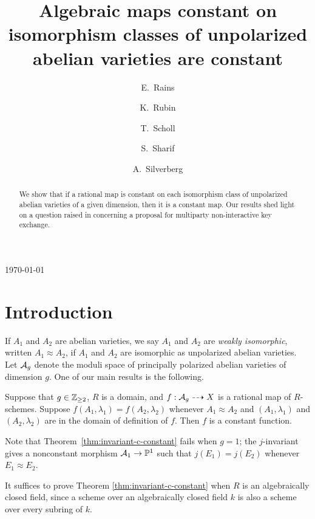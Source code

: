 \documentclass{amsart}
\title[Algebraic maps constant on unpolarized isomorphism classes]{Algebraic maps constant on isomorphism classes of unpolarized abelian varieties are constant}
\author[E.\ Rains]{E.\ Rains}
\author[K.\ Rubin]{K.\ Rubin}
\author[T.\ Scholl]{T.\ Scholl}
\author[S.\ Sharif]{S.\ Sharif}
\author[A.\ Silverberg]{A.\ Silverberg}
\begin{document}
\begin{abstract}
We show that if a %
rational map is constant on each isomorphism class of unpolarized abelian varieties of a given dimension, then it is a constant map. 
Our results shed light on a question raised in \cite{multiparty} concerning a proposal for multiparty non-interactive key exchange.
\end{abstract}


\today
\maketitle



\section{Introduction}
\label{sec:introduction}

If $A_1$ and $A_2$ are abelian varieties, we say $A_1$ and $A_2$ are \emph{weakly isomorphic}, written $A_1 \approx A_2$, if $A_1$ and $A_2$ are isomorphic as unpolarized abelian varieties. Let $\mathcal{A}_g$ denote the moduli space of principally polarized abelian varieties of dimension $g$. One of our main results is the following.
\begin{theorem}\label{thm:invariant-c-constant}
  Suppose that $g\in\mathbb{Z}_{\ge 2}$, $R$ is a domain, and $f: \mathcal{A}_g \dashrightarrow X$ is a rational map of $R$-schemes. Suppose $f(A_1,\lambda_1) = f(A_2,\lambda_2)$ whenever $A_1 \approx A_2$ and $(A_1,\lambda_1)$ and $(A_2,\lambda_2)$ are in the domain of definition of $f$. Then $f$ is a constant function.
\end{theorem}
Note that Theorem~\ref{thm:invariant-c-constant} fails when $g = 1$; the $j$-invariant gives a nonconstant morphism $\mathcal{A}_1 \to \mathbb{P}^1$ such that $j(E_1) = j(E_2)$ whenever $E_1 \approx E_2$.

It suffices to prove Theorem \ref{thm:invariant-c-constant} when $R$ is an algebraically closed field, since a scheme over an algebraically closed field $k$ is also a scheme over every subring of $k$.


\end{document}
